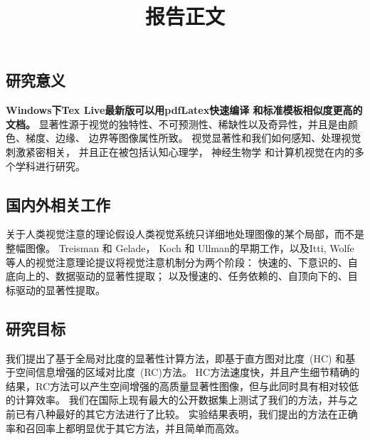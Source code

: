 \documentclass[UTF8,12pt,AutoFakeBold]{article}
\begin{document}

\title{报告正文}

\maketitle

{}







\subsection{研究意义}


\textbf{Windows下Tex Live最新版可以用pdfLatex快速编译
和标准模板相似度更高的文档。}
%
显著性源于视觉的独特性、不可预测性、稀缺性以及奇异性，并且是由颜色、梯度、边缘、
边界等图像属性所致。
视觉显著性和我们如何感知、处理视觉刺激紧密相关，
并且正在被包括认知心理学，
神经生物学
和计算机视觉在内的多个学科进行研究。



\subsection{国内外相关工作}

关于人类视觉注意的理论假设人类视觉系统只详细地处理图像的某个局部，而不是整幅图像。
Treisman 和 Gelade， Koch 和
Ullman的早期工作，以及Itti, Wolfe 等人的视觉注意理论提议将视觉注意机制分为两个阶段：
快速的、下意识的、自底向上的、数据驱动的显著性提取；
以及慢速的、任务依赖的、自顶向下的、目标驱动的显著性提取。



{

}



\subsection{研究目标}
我们提出了基于全局对比度的显著性计算方法，即基于直方图对比度~(HC) 和基于空间信息增强的区域对比度~(RC)方法。
HC方法速度快，并且产生细节精确的结果，RC方法可以产生空间增强的高质量显著性图像，但与此同时具有相对较低的计算效率。
我们在国际上现有最大的公开数据集上测试了我们的方法，并与之前已有八种最好的其它方法进行了比较。
实验结果表明，我们提出的方法在正确率和召回率上都明显优于其它方法，并且简单而高效。
\end{document}
